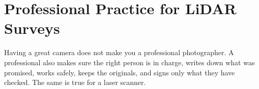 \chapter{Professional Practice for LiDAR Surveys}

\begin{kid}
Having a great camera does not make you a professional photographer. A professional also makes sure the right person is in charge, writes down what was promised, works safely, keeps the originals, and signs only what they have checked. The same is true for a laser scanner.
\end{kid}
